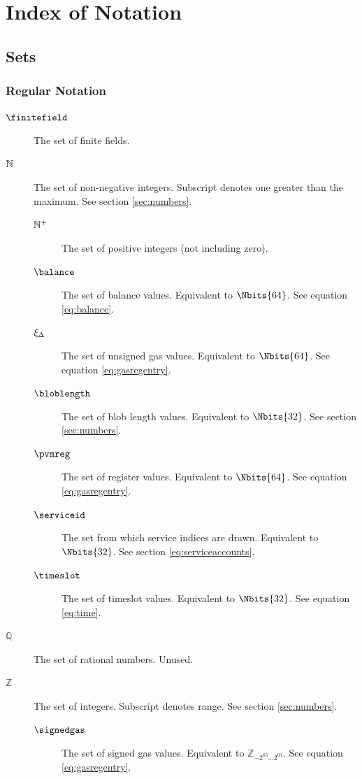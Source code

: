 \section{Index of Notation}\label{sec:definitions}

\subsection{Sets}

\subsubsection{Regular Notation}
\begin{description}
  \item[$\finitefield$] The set of finite fields.
  \item[$\mathbb{N}$] The set of non-negative integers. Subscript denotes one greater than the maximum. See section \ref{sec:numbers}.
  \begin{description}
    \item[$\mathbb{N}^+$] The set of positive integers (not including zero).
    \item[$\balance$] The set of balance values. Equivalent to $\Nbits{64}$. See equation \ref{eq:balance}.
    \item[$\xi_\Delta$] The set of unsigned gas values. Equivalent to $\Nbits{64}$. See equation \ref{eq:gasregentry}.
    \item[$\bloblength$] The set of blob length values. Equivalent to $\Nbits{32}$. See section \ref{sec:numbers}.
    \item[$\pvmreg$] The set of register values. Equivalent to $\Nbits{64}$. See equation \ref{eq:gasregentry}.
    \item[$\serviceid$] The set from which service indices are drawn. Equivalent to $\Nbits{32}$. See section \ref{eq:serviceaccounts}.
    \item[$\timeslot$] The set of timeslot values. Equivalent to $\Nbits{32}$. See equation \ref{eq:time}.
  \end{description}
  \item[$\mathbb{Q}$] The set of rational numbers. Unused.
  \item[$\mathbb{Z}$] The set of integers. Subscript denotes range. See section \ref{sec:numbers}.
  \begin{description}
    \item[$\signedgas$] The set of signed gas values. Equivalent to $\mathbb{Z}_{-2^{63}\dots2^{63}}$. See equation \ref{eq:gasregentry}.
  \end{description}
\end{description}

